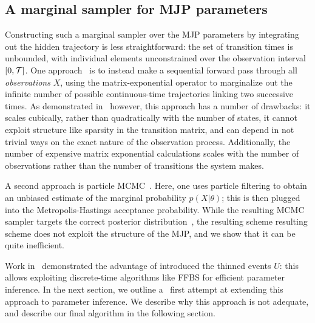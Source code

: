 \subsection{A marginal sampler for MJP parameters} 
Constructing such a marginal sampler over the MJP parameters by
integrating out the hidden trajectory is less straightforward:
the set of transition times is unbounded, with individual elements
unconstrained over the observation interval $[0,{\mathcal T}]$.
One approach~\cite{FearnSher2006} is to instead make a sequential 
forward pass through all {\em observations} $X$, using the matrix-exponential
operator to marginalize out the infinite number of possible 
continuous-time trajectories linking two successive times. As
demonstrated in~\cite{RaoTeh13} however, this approach has a number of 
drawbacks: it scales cubically, rather than quadratically with the 
number of states, it cannot exploit structure like sparsity in the 
transition matrix, and can depend in not trivial ways on the exact 
nature of the observation process.
Additionally, the number of expensive matrix exponential calculations scales
with the number of observations rather than the number of transitions the
system makes.

A second approach is particle MCMC~\cite{Andrieu10}. Here, one uses 
particle filtering to obtain an unbiased estimate of the marginal 
probability $p(X|\theta)$; this is then plugged into the 
Metropolis-Hastings acceptance probability. While the resulting MCMC 
sampler targets the correct posterior distribution~\cite{Andrieu09}, 
the resulting scheme resulting scheme does not exploit the structure 
of the MJP, and we show that it can be quite inefficient.

Work in~\cite{RaoTeh13, RaoTeh12} demonstrated the advantage of
introduced the thinned events $U$: this allows exploiting discrete-time 
algorithms like FFBS for efficient parameter inference.
In the next section, we outline a \naive\  first attempt at extending this 
approach to parameter inference.
We describe why this approach is not adequate, and describe our
final algorithm in the following section. 

